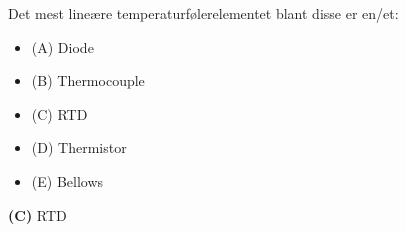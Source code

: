 

Det mest lineære temperaturfølerelementet blant disse er en/et:

\begin{itemize}
\item{(A)} Diode
\vskip 5pt 
\item{(B)} Thermocouple
\vskip 5pt 
\item{(C)} RTD
\vskip 5pt 
\item{(D)} Thermistor
\vskip 5pt 
\item{(E)} Bellows
\end{itemize}







{\bf (C)} RTD
 









